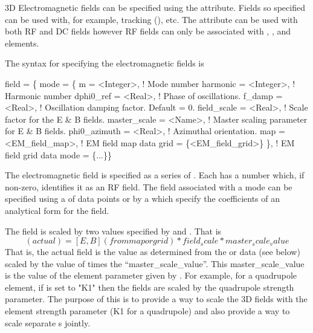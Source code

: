 3D Electromagnetic fields can be specified using the 
attribute. Fields so specified can be used with, for example,
 tracking (), etc. The 
attribute can be used with both RF and DC fields however RF fields can
only be associated with , , and 
elements.

The syntax for specifying the electromagnetic fields is
\begin{example}
  field = \{
    mode = \{
      m             = <Integer>, ! Mode number
      harmonic      = <Integer>, ! Harmonic number 
      dphi0_ref     = <Real>,    ! Phase of oscillations.
      f_damp        = <Real>,    ! Oscillation damping factor. Default = 0.
      field_scale   = <Real>,    ! Scale factor for the E & B fields.
      master_scale  = <Name>,    ! Master scaling parameter for E & B fields.
      phi0_azimuth  = <Real>,    ! Azimuthal orientation.
      map           = <EM_field_map>,        ! EM field map data
      grid          = \{<EM_field_grid>\} \},    ! EM field grid data
    mode = \{...\}\}
\end{example}
The electromagnetic field is specified as a series of . Each
 has a  number which, if non-zero, identifies it
as an RF field. The field associated with a mode can be specified
using a  of data points or by a  which specify the
coefficients of an analytical form for the field.

The field is scaled by two values specified by  and
. That is
\begin{equation}
  [E, B] (actual) = [E, B] (from map or grid) * field_scale * master_scale_value
\end{equation}
That is, the actual field is the value as determined from the 
or  data (see below) scaled by the value of 
times the ``master_scale_value''. This master_scale_value is the value
of the element parameter given by . For example, for
a quadrupole element, if  is set to "K1" then the
fields are scaled by the quadrupole strength parameter. The purpose of
this  is to provide a way to scale the 3D fields with
the element strength parameter (K1 for a quadrupole) and also provide
a way to scale separate s jointly.

